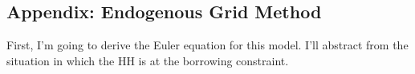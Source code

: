 \documentclass[12pt,pdftex]{article}
\begin{document}
\begin{onehalfspacing}
 
%
%
%


\newpage


\section{Appendix: Endogenous Grid Method}

First, I'm going to derive the Euler equation for this model. I'll abstract from the situation in which the HH is at the borrowing constraint.


\end{onehalfspacing}
\end{document}
